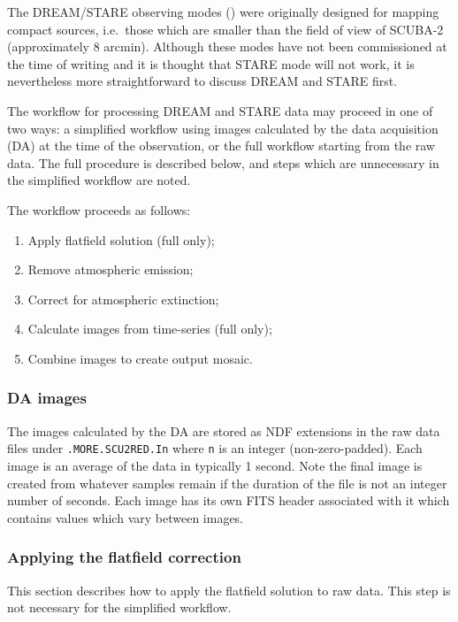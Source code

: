 \documentclass[twoside,11pt]{article}
\newcommand{\xlabel}[1]{}
\renewcommand{\_}{\texttt{\symbol{95}}}
\begin{document}
The DREAM/STARE observing modes (\cite{scuba2}) were originally
designed for mapping compact sources, i.e.\ those which are smaller
than the field of view of SCUBA-2 (approximately 8 arcmin). Although
these modes have not been commissioned at the time of writing and it
is thought that STARE mode will not work, it is nevertheless more
straightforward to discuss DREAM and STARE first.

The workflow for processing DREAM and STARE data may proceed in one of
two ways: a simplified workflow using images calculated by the data
acquisition (DA) at the time of the observation, or the full workflow
starting from the raw data. The full procedure is described below, and
steps which are unnecessary in the simplified workflow are noted.

The workflow proceeds as follows:
\begin{enumerate}
\item Apply flatfield solution (full only);
\item Remove atmospheric emission;
\item Correct for atmospheric extinction;
\item Calculate images from time-series (full only);
\item Combine images to create output mosaic.
\end{enumerate}

\subsubsection{DA images}

The images calculated by the DA are stored as NDF extensions in the
raw data files under \texttt{.MORE.SCU2RED.In} where \texttt{n} is an
integer (non-zero-padded). Each image is an average of the data in
typically 1 second. Note the final image is created from whatever
samples remain if the duration of the file is not an integer number of
seconds. Each image has its own FITS header associated with it which
contains values which vary between images.

\subsubsection{\xlabel{flatfield}Applying the flatfield correction\label{se:flatfield}}

This section describes how to apply the flatfield solution to raw
data. This step is not necessary for the simplified workflow.
\end{document}
